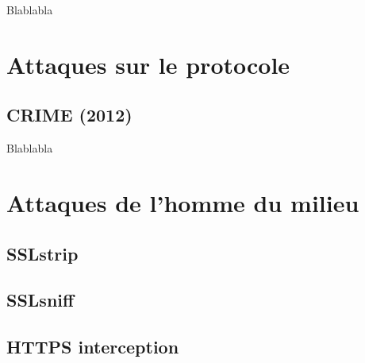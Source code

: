 Blablabla \cite{sweet32}

\section{Attaques sur le protocole}

\subsection{CRIME (2012)}

Blablabla \cite{crime}

\section{Attaques de l'homme du milieu}

\subsection{SSLstrip}

\subsection{SSLsniff}

\subsection{HTTPS interception}
